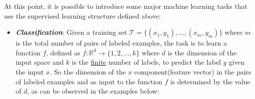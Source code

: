 \vspace{5mm}
At this point, it is possible to introduce some major machine learning
tasks that use the supervised learning structure defined above:

\begin{itemize}
      \item \emph{\textbf{Classification}}: Given a training set
            $\mathcal{T}=\{(x_1,y_1),...,(x_m,y_m)\}$ where
            $m$ is the total number of pairs of labeled examples,
            the task is to learn a function $f$, defined as
            $f : \mathbb{R}^d \rightarrow \{1,2,...,k\}$ where $d$
            is the dimension of the input space and $k$ is the
            \underline{finite} number of labels, to predict the label
            $y$ given the input $x$. So the dimension of the $x$
            component(feature vector) in the pairs of labeled examples
            and as input to the function $f$ is determined by the value
            of $d$, as can be observed in the examples below:

            \vspace{5mm}


\end{itemize}
